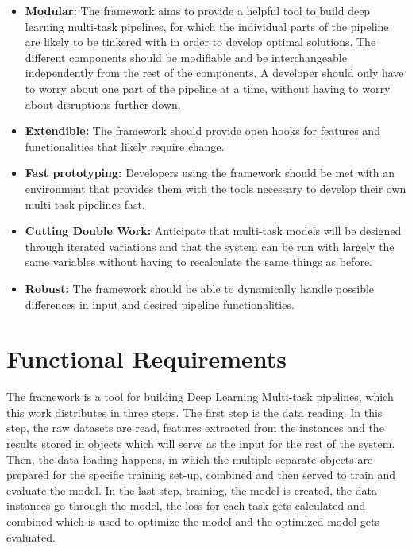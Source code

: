 \begin{itemize}
	\item \textbf{Modular:} The framework aims to provide a helpful tool to build deep learning multi-task pipelines, for which the individual parts of the pipeline are likely to be tinkered with in order to develop optimal solutions. The different components should be modifiable and be interchangeable independently from the rest of the components. A developer should only have to worry about one part of the pipeline at a time, without having to worry about disruptions further down.
	\item \textbf{Extendible:} The framework should provide open hooks for features and functionalities that likely require change. 
	\item \textbf{Fast prototyping:} Developers using the framework should be met with an environment that provides them with the tools necessary to develop their own multi task pipelines fast.
	\item \textbf{Cutting Double Work:} Anticipate that multi-task models will be designed through iterated variations and that the system can be run with largely the same variables without having to recalculate the same things as before.
	\item \textbf{Robust:} The framework should be able to dynamically handle possible differences in input and desired pipeline functionalities.

\end{itemize}

\section{Functional Requirements}

The framework is a tool for building Deep Learning Multi-task pipelines, which this work distributes in three steps. The first step is the data reading. In this step, the raw datasets are read, features extracted from the instances and the results stored in objects which will serve as the input for the rest of the system. Then, the data loading happens, in which the multiple separate objects are prepared for the specific training set-up, combined and then served to train and evaluate the model. In the last step, training, the model is created, the data instances go through the model, the loss for each task gets calculated and combined which is used to optimize the model and the optimized model gets evaluated. 

